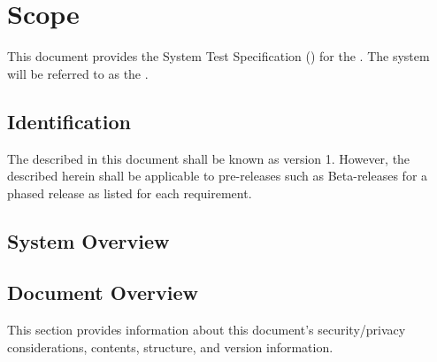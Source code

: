 
\chapter{Scope}
\label{loc:Scope}


This document provides the System Test Specification (\STS) for the \ThisSystem. 
The system will be referred to as the \ThisSys.

\section{Identification}
\label{loc:Identification}


The \ThisSystem described in this document shall be known as \ThisSys version 1.
However, the \STS described herein shall be applicable to pre-releases such as Beta-releases for a phased release as listed for each requirement.

\section{System Overview}
\label{loc:SystemOverview}





\section{Document Overview}
\label{loc:DocumentOverview}


This section provides information about this document's security/privacy considerations, contents, structure, and version information.

% 

% 

% 

